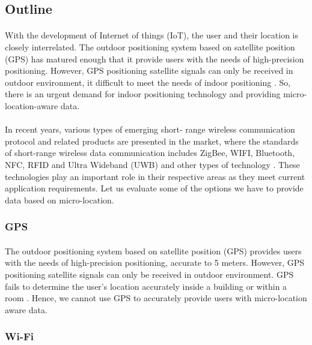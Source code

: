 \documentclass[12pt]{article}
\begin{document}
\subsection{Outline}

\paragraph{}With the development of Internet of things (IoT), the user and their location is closely interrelated. The outdoor positioning system based on satellite position (GPS) has matured enough that it provide users with the needs of high-precision positioning. However, GPS positioning satellite signals can only be received in outdoor environment, it difficult to meet the needs of indoor positioning  \cite{indoor}. So, there is an urgent demand for indoor positioning technology and providing micro-location-aware data. 

\paragraph{}In recent years, various types of emerging short- range wireless communication protocol and related products are presented in the market, where the standards of short-range wireless data communication includes ZigBee, WIFI, Bluetooth, NFC, RFID and Ultra Wideband (UWB) and other types of technology \cite{indoorPositioning}. These technologies play an important role in their respective areas as they meet current application requirements. Let us evaluate some of the options we have to provide data based on micro-location.

\subsubsection{GPS}
\paragraph{} The outdoor positioning system based on satellite position (GPS) provides users with the needs of high-precision positioning, accurate to 5 meters. However, GPS positioning satellite signals can only be received in outdoor environment. GPS fails to determine the user's location accurately inside a building or within a room \cite{indoor}. Hence, we cannot use GPS to accurately provide users with micro-location aware data.

\subsubsection{Wi-Fi}
\end{document}
